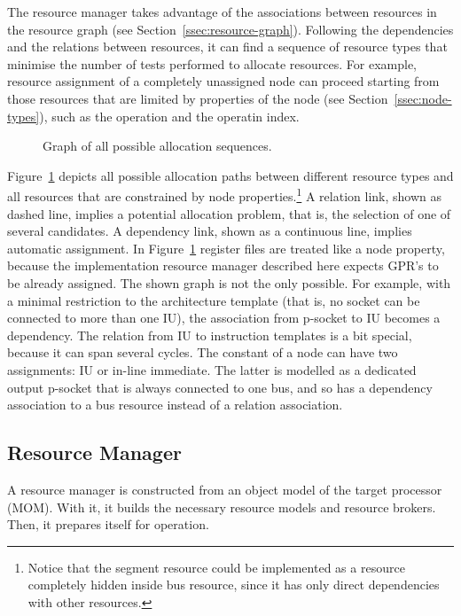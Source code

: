 \documentclass[a4paper,twoside]{tce}
\begin{document}
The resource manager takes advantage of the associations between resources
in the resource graph (see Section~\ref{ssec:resource-graph}). Following the
dependencies and the relations between resources, it can find a sequence of
resource types that minimise the number of tests performed to allocate
resources. For example, resource assignment of a completely unassigned node
can proceed starting from those resources that are limited by properties of
the node (see Section~\ref{ssec:node-types}), such as the operation and the
operatin index.
%
\begin{figure}[tb]
\centerline{}
\caption{Graph of all possible allocation sequences.}
  \label{fig:allocation-graph}
\end{figure}
%
Figure~\ref{fig:allocation-graph} depicts all possible allocation paths
between different resource types and all resources that are constrained by
node properties.\footnote{
%
  Notice that the segment resource could be implemented as a resource
  completely hidden inside bus resource, since it has only direct
  dependencies with other resources.}
%
A relation link, shown as dashed line, implies a potential allocation
problem, that is, the selection of one of several candidates. A dependency
link, shown as a continuous line, implies automatic assignment.
%
In Figure~\ref{fig:allocation-graph} register files are treated like a node
property, because the implementation resource manager described here expects
GPR's to be already assigned.
%
The shown graph is not the only possible. For example, with a minimal
restriction to the architecture template (that is, no socket can be
connected to more than one IU), the association from p-socket to IU becomes
a dependency.
%
The relation from IU to instruction templates is a bit special, because it
can span several cycles.
%
The constant of a node can have two assignments: IU or in-line immediate.
The latter is modelled as a dedicated output p-socket that is always
connected to one bus, and so has a dependency association to a bus resource
instead of a relation association.

\subsection{Resource Manager}
\label{ssec:ResourceManager}

A resource manager is constructed from an object model of the target
processor (MOM). With it, it builds the necessary resource models and
resource brokers. Then, it prepares itself for operation.
\end{document}
